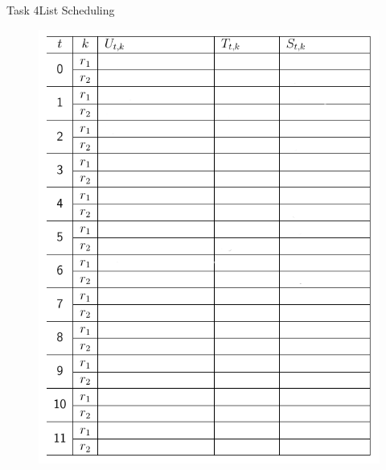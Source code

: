 \begin{frame}[allowframebreaks]{Task 4}{List Scheduling}
\begin{solutionnoinc}
\begin{figure}
      \includegraphics[height=0.5\paperheight]{./figures/task4_schedule_empty.png}
    \end{figure}
  \end{solutionnoinc}
  \framebreak
  \begin{solution}
    \begin{figure}
      \centering

\end{figure}
\end{solution}
\end{frame}
